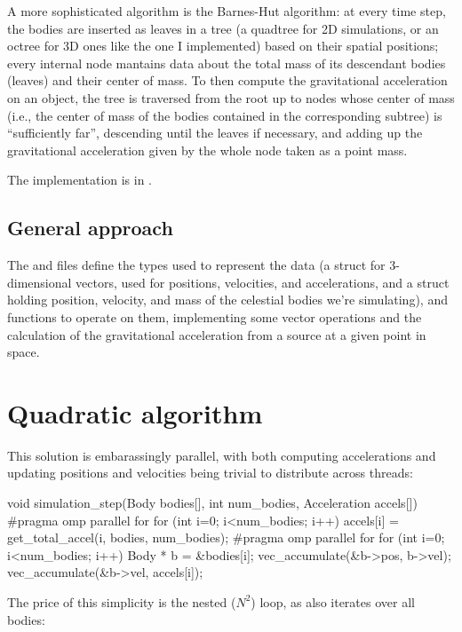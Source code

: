 \documentclass[a4paper, 11pt]{article}
\newcommand\bh{Barnes-Hut}
\begin{document}
A more sophisticated algorithm is the \bh{} algorithm: at every time step,
the bodies are inserted as leaves in a tree
(a quadtree for 2D simulations, or an octree for 3D ones like the one I implemented)
based on their spatial positions;
every internal node mantains data about the total mass of its descendant bodies (leaves)
and their center of mass. To then compute the gravitational acceleration on an object,
the tree is traversed from the root up to nodes whose center of mass
(i.e., the center of mass of the bodies contained in the corresponding subtree)
is ``sufficiently far'', descending until the leaves if necessary,
and adding up the gravitational acceleration given by the whole node taken as a point mass.

The implementation is in .

\subsection{General approach}

The  and  files define the types used to represent the data
(a  struct for 3-dimensional vectors,
used for positions, velocities, and accelerations,
and a  struct holding position, velocity, and mass of the celestial bodies
we're simulating), and functions to operate on them, implementing some vector operations
and the calculation of the gravitational acceleration from a source at a given point in space.

\section{Quadratic algorithm}

This solution is embarassingly parallel,
with both computing accelerations and updating positions and velocities
being trivial to distribute across threads:

\begin{ccode}
void simulation_step(Body bodies[], int num_bodies, Acceleration accels[]) {
#pragma omp parallel for
	for (int i=0; i<num_bodies; i++) {
		accels[i] = get_total_accel(i, bodies, num_bodies);
	}
#pragma omp parallel for
	for (int i=0; i<num_bodies; i++) {
		Body * b = &bodies[i];
		vec_accumulate(&b->pos, b->vel);
		vec_accumulate(&b->vel, accels[i]);
	}
}
\end{ccode}

The price of this simplicity is the nested ($N^2$) loop, as 
also iterates over all bodies:
\end{document}
